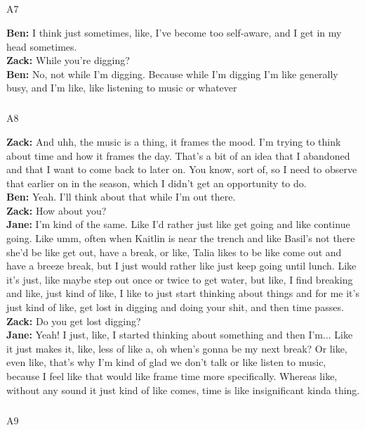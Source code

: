 \documentclass[
]{article}
\makeatletter
\let\oldsubparagraph\subparagraph
\renewcommand{\subparagraph}{
    \@ifstar
      \xxxSubParagraphStar
      \xxxSubParagraphNoStar
  }
\newcommand{\xxxSubParagraphStar}[1]{\oldsubparagraph*{#1}\mbox{}}
\newcommand{\xxxSubParagraphNoStar}[1]{\oldsubparagraph{#1}\mbox{}}
\makeatother
\begin{document}
\subparagraph{A7}\label{sec-A7}

\textbf{Ben:} I think just sometimes, like, I've become too self-aware,
and I get in my head sometimes.\\
\textbf{Zack:} While you're digging?\\
\textbf{Ben:} No, not while I'm digging. Because while I'm digging I'm
like generally busy, and I'm like, like listening to music or whatever

\subparagraph{A8}\label{sec-A8}

\textbf{Zack:} And uhh, the music is a thing, it frames the mood. I'm
trying to think about time and how it frames the day. That's a bit of an
idea that I abandoned and that I want to come back to later on. You
know, sort of, so I need to observe that earlier on in the season, which
I didn't get an opportunity to do.\\
\textbf{Ben:} Yeah. I'll think about that while I'm out there.\\
\textbf{Zack:} How about you?\\
\textbf{Jane:} I'm kind of the same. Like I'd rather just like get going
and like continue going. Like umm, often when Kaitlin is near the trench
and like Basil's not there she'd be like get out, have a break, or like,
Talia likes to be like come out and have a breeze break, but I just
would rather like just keep going until lunch. Like it's just, like
maybe step out once or twice to get water, but like, I find breaking and
like, just kind of like, I like to just start thinking about things and
for me it's just kind of like, get lost in digging and doing your shit,
and then time passes.\\
\textbf{Zack:} Do you get lost digging?\\
\textbf{Jane:} Yeah! I just, like, I started thinking about something
and then I'm... Like it just makes it, like, less of like a, oh when's
gonna be my next break? Or like, even like, that's why I'm kind of glad
we don't talk or like listen to music, because I feel like that would
like frame time more specifically. Whereas like, without any sound it
just kind of like comes, time is like insignificant kinda thing.

\subparagraph{A9}\label{sec-A9}
\end{document}

